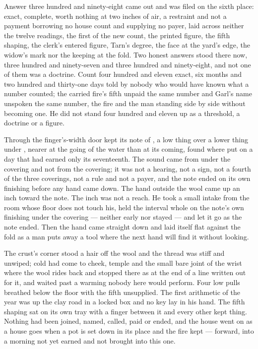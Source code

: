 Answer three hundred and ninety-eight came out and was filed on the sixth place: exact, complete, worth nothing at two inches of air, a restraint and not a payment borrowing no house count and supplying no payer, laid across neither the twelve readings, the first of the new count, the printed figure, the fifth shaping, the clerk's entered figure, Tarn's degree, the face at the yard's edge, the widow's mark nor the keeping at the fold. Two honest answers stood there now, three hundred and ninety-seven and three hundred and ninety-eight, and not one of them was a doctrine. Count four hundred and eleven exact, six months and two hundred and thirty-one days told by nobody who would have known what a number counted; the carried fire's fifth unpaid the same number and Garl's name unspoken the same number, the fire and the man standing side by side without becoming one. He did not stand four hundred and eleven up as a threshold, a doctrine or a figure.

Through the finger's-width door  kept its note of , a low thing over a lower thing under , nearer at the going of the water than at its coming, found where put on a day that had earned only its seventeenth. The sound came from under the covering and not from the covering; it was not a hearing, not a sign, not a fourth of the three coverings, not a rule and not a payer, and the note ended on its own finishing before any hand came down. The hand outside the wool came up an inch toward the note. The inch was not a reach. He took a small intake from the room whose floor does not touch his, held the interval whole on the note's own finishing under the covering --- neither early nor stayed --- and let it go as the note ended. Then the hand came straight down and laid itself flat against the fold as a man puts away a tool where the next hand will find it without looking.

The crust's corner stood a hair off the wool and the thread was stiff and unwiped; cold had come to cheek, temple and the small bare joint of the wrist where the wool rides back and stopped there as at the end of a line written out for it, and  waited past a warming nobody here would perform. Four low pulls breathed below the floor with the fifth unsupplied. The first arithmetic of the year was up the clay road in a locked box and no key lay in his hand. The fifth shaping sat on its own tray with a finger between it and every other kept thing. Nothing had been joined, named, called, paid or ended, and the house went on as a house goes when a pot is set down in its place and the fire kept --- forward, into a morning not yet earned and not brought into this one.
